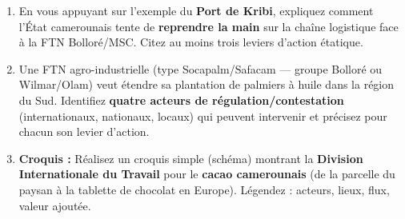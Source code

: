 \documentclass[11pt]{article}
\begin{document}
\begin{exercice}
\begin{enumerate}
    \item En vous appuyant sur l'exemple du \textbf{Port de Kribi}, expliquez comment l'État camerounais tente de \textbf{reprendre la main} sur la chaîne logistique face à la FTN Bolloré/MSC. Citez au moins trois leviers d'action étatique.
    \item Une FTN agro-industrielle (type Socapalm/Safacam — groupe Bolloré ou Wilmar/Olam) veut étendre sa plantation de palmiers à huile dans la région du Sud. Identifiez \textbf{quatre acteurs de régulation/contestation} (internationaux, nationaux, locaux) qui peuvent intervenir et précisez pour chacun son levier d'action.
    \item \textbf{Croquis :} Réalisez un croquis simple (schéma) montrant la \textbf{Division Internationale du Travail} pour le \textbf{cacao camerounais} (de la parcelle du paysan à la tablette de chocolat en Europe). Légendez : acteurs, lieux, flux, valeur ajoutée.
\end{enumerate}
\end{exercice}
\end{document}
